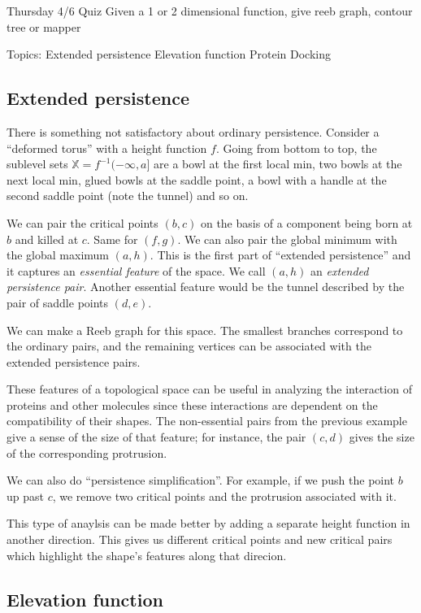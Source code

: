 

Thursday 4/6 Quiz
Given a 1 or 2 dimensional function, give reeb graph, contour tree or mapper

Topics:
Extended persistence
Elevation function
Protein Docking

\subsection{Extended persistence}

There is something not satisfactory about ordinary persistence. Consider a ``deformed torus'' with a height function $f$. Going from bottom to top, the sublevel sets $\mathbb{X}=f^{-1}(-\infty,a]$ are a bowl at the first local min, two bowls at the next local min, glued bowls at the saddle point, a bowl with a handle at the second saddle point (note the tunnel) and so on.

We can pair the critical points $(b,c)$ on the basis of a component being born at $b$ and killed at $c$. Same for $(f,g)$. We can also pair the global minimum with the global maximum $(a,h)$. This is the first part of ``extended persistence'' and it captures an \emph{essential feature} of the space. We call $(a,h)$ an \emph{extended persistence pair}. Another essential feature would be the tunnel described by the pair of saddle points $(d,e)$.

We can make a Reeb graph for this space. The smallest branches correspond to the ordinary pairs, and the remaining vertices can be associated with the extended persistence pairs.

These features of a topological space can be useful in analyzing the interaction of proteins and other molecules since these interactions are dependent on the compatibility of their shapes. The non-essential pairs from the previous example give a sense of the size of that feature; for instance, the pair $(c,d)$ gives the size of the corresponding protrusion.

We can also do ``persistence simplification''. For example, if we push the point $b$ up past $c$, we remove two critical points and the protrusion associated with it.

This type of anaylsis can be made better by adding a separate height function in another direction. This gives us different critical points and new critical pairs which highlight the shape's features along that direcion.

\subsection{Elevation function}

